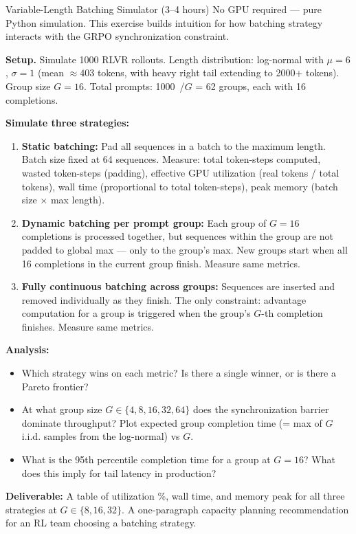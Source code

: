 \begin{exercise}{Variable-Length Batching Simulator (3--4 hours)}
No GPU required --- pure Python simulation. This exercise builds intuition for how batching strategy interacts with the GRPO synchronization constraint.

\textbf{Setup.} Simulate 1000 RLVR rollouts. Length distribution: log-normal with $\mu = 6$, $\sigma = 1$ (mean $\approx 403$ tokens, with heavy right tail extending to 2000+ tokens). Group size $G = 16$. Total prompts: 1000~/$G$ = 62 groups, each with 16 completions.

\textbf{Simulate three strategies:}
\begin{enumerate}
  \item \textbf{Static batching:} Pad all sequences in a batch to the maximum length. Batch size fixed at 64 sequences. Measure: total token-steps computed, wasted token-steps (padding), effective GPU utilization (real tokens / total tokens), wall time (proportional to total token-steps), peak memory (batch size $\times$ max length).
  \item \textbf{Dynamic batching per prompt group:} Each group of $G = 16$ completions is processed together, but sequences within the group are not padded to global max --- only to the group's max. New groups start when all 16 completions in the current group finish. Measure same metrics.
  \item \textbf{Fully continuous batching across groups:} Sequences are inserted and removed individually as they finish. The only constraint: advantage computation for a group is triggered when the group's $G$-th completion finishes. Measure same metrics.
\end{enumerate}

\textbf{Analysis:}
\begin{itemize}
  \item Which strategy wins on each metric? Is there a single winner, or is there a Pareto frontier?
  \item At what group size $G \in \{4, 8, 16, 32, 64\}$ does the synchronization barrier dominate throughput? Plot expected group completion time (= max of $G$ i.i.d. samples from the log-normal) vs $G$.
  \item What is the 95th percentile completion time for a group at $G = 16$? What does this imply for tail latency in production?
\end{itemize}

\textbf{Deliverable:} A table of utilization \%, wall time, and memory peak for all three strategies at $G \in \{8, 16, 32\}$. A one-paragraph capacity planning recommendation for an RL team choosing a batching strategy.
\end{exercise}

